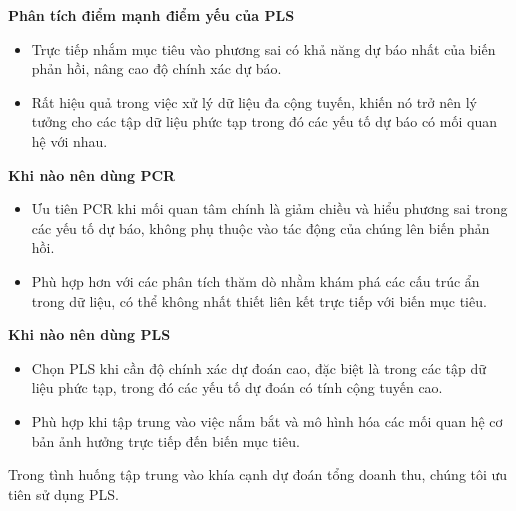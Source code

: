 \textbf{Phân tích điểm mạnh điểm yếu của PLS}
\begin{itemize}
    \item Trực tiếp nhắm mục tiêu vào phương sai có khả năng dự báo nhất của biến phản hồi, nâng cao độ chính xác dự báo.
    \item Rất hiệu quả trong việc xử lý dữ liệu đa cộng tuyến, khiến nó trở nên lý tưởng cho các tập dữ liệu phức tạp trong đó các yếu tố dự báo có mối quan hệ với nhau.
\end{itemize}

\textbf{Khi nào nên dùng PCR}
\begin{itemize}
    \item Ưu tiên PCR khi mối quan tâm chính là giảm chiều và hiểu phương sai trong các yếu tố dự báo, không phụ thuộc vào tác động của chúng lên biến phản hồi.
    \item Phù hợp hơn với các phân tích thăm dò nhằm khám phá các cấu trúc ẩn trong dữ liệu, có thể không nhất thiết liên kết trực tiếp với biến mục tiêu.
\end{itemize}

\textbf{Khi nào nên dùng PLS}
\begin{itemize}
    \item Chọn PLS khi cần độ chính xác dự đoán cao, đặc biệt là trong các tập dữ liệu phức tạp, trong đó các yếu tố dự đoán có tính cộng tuyến cao.
    \item Phù hợp khi tập trung vào việc nắm bắt và mô hình hóa các mối quan hệ cơ bản ảnh hưởng trực tiếp đến biến mục tiêu.
\end{itemize}

Trong tình huống tập trung vào khía cạnh dự đoán tổng doanh thu, chúng tôi ưu tiên sử dụng PLS.